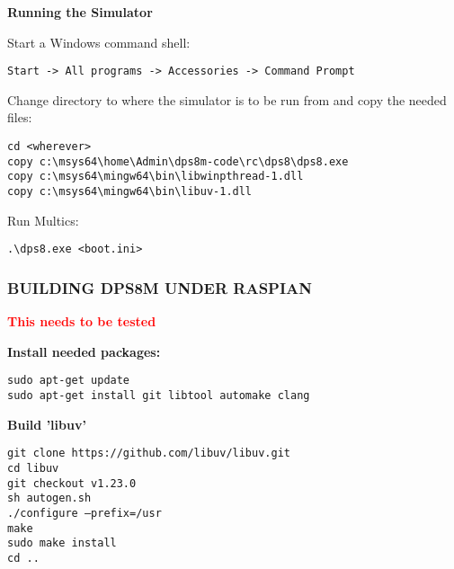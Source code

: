 \textbf{Running the Simulator}

Start a Windows command shell:

\begin{adjustwidth}{5ex}{1ex}
    \texttt{Start -> All programs -> Accessories -> Command Prompt} \\
\end{adjustwidth}  

Change directory to where the simulator is to be run from and copy the needed files:

\begin{adjustwidth}{5ex}{1ex}
    \texttt{cd <wherever>} \\
    \texttt{copy c:\textbackslash{}msys64\textbackslash{}home\textbackslash{}Admin\textbackslash{}dps8m-code\textbackslash{}rc\textbackslash{}dps8\textbackslash{}dps8.exe} \\
    \texttt{copy c:\textbackslash{}msys64\textbackslash{}mingw64\textbackslash{}bin\textbackslash{}libwinpthread-1.dll} \\
    \texttt{copy c:\textbackslash{}msys64\textbackslash{}mingw64\textbackslash{}bin\textbackslash{}libuv-1.dll} \\
\end{adjustwidth}  

Run Multics:

\begin{adjustwidth}{5ex}{1ex}
    \texttt{.\textbackslash{}dps8.exe <boot.ini>} \\
\end{adjustwidth}  

\newpage

\subsubsection[Building dps8m under Raspbian]{BUILDING DPS8M UNDER RASPIAN}

\textbf{\textcolor{red}{This needs to be tested}}

\textbf{Install needed packages:}

\begin{adjustwidth}{5ex}{1ex}
	\texttt{sudo apt-get update} \\
    \texttt{sudo apt-get install git libtool automake clang}
\end{adjustwidth}  

\textbf{Build 'libuv'}

\begin{adjustwidth}{5ex}{1ex}
    \texttt{git clone https://github.com/libuv/libuv.git} \\
    \texttt{cd libuv} \\
    \texttt{git checkout v1.23.0} \\
    \texttt{sh autogen.sh} \\
    \texttt{./configure --prefix=/usr} \\
    \texttt{make} \\
    \texttt{sudo make install} \\
    \texttt{cd ..} \\
\end{adjustwidth}  


